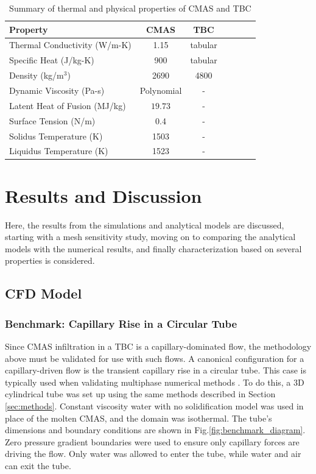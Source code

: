\documentclass[%
 aip,
 amsmath,amssymb,
 reprint,%
floatfix]{revtex4-1}
\begin{document}
\begin{table}
\caption{\label{tab:CMAS and TBC properties} Summary of thermal and physical properties of CMAS and TBC}
\centering
\begin{ruledtabular}
\begin{tabular}{lcccccc}
Property & CMAS& TBC\\\hline
Thermal Conductivity (W/m-K)& 1.15 \cite{Bakal2017} & tabular \cite{Han2023} \\
Specific Heat (J/kg-K)& 900 \cite{KAKUDA2015350} & tabular \cite{Han2023} \\
Density (kg/m$^3$)& 2690 \cite{BANSAL20153901}& 4800 \cite{KAKUDA20092583}\\
Dynamic Viscosity (Pa-s)& Polynomial \cite{Naraparaju2019}& -\\
Latent Heat of Fusion (MJ/kg)& $19.73$ \cite{Costa2019}& -\\
Surface Tension (N/m)& 0.4 \cite{Bravo2020}& -\\
Solidus Temperature (K) & 1503\cite{Naraparaju2014} &-\\
Liquidus Temperature (K) & 1523\cite{Naraparaju2014} &-\\
\end{tabular}
\end{ruledtabular}
\end{table}



\section{Results and Discussion}
Here, the results from the simulations and analytical models are discussed, starting with a mesh sensitivity study, moving on to comparing the analytical models with the numerical results, and finally characterization based on several properties is considered.

\subsection{CFD Model}
\subsubsection{Benchmark: Capillary Rise in a Circular Tube}

Since CMAS infiltration in a TBC is a capillary-dominated flow, the methodology above must be validated for use with such flows.
A canonical configuration for a capillary-driven flow is the transient capillary rise in a circular tube.
This case is typically used when validating multiphase numerical methods \cite{GRUNDING2020142, Shiri2022}. 
To do this, a 3D cylindrical tube was set up using the same methods described in Section \ref{sec:methods}.
Constant viscosity water with no solidification model was used in place of the molten CMAS, and the domain was isothermal.
The tube's dimensions and boundary conditions are shown in Fig.\ref{fig:benchmark_diagram}. Zero pressure gradient boundaries were used to ensure only capillary forces are driving the flow. Only water was allowed to enter the tube, while water and air can exit the tube.
\end{document}

